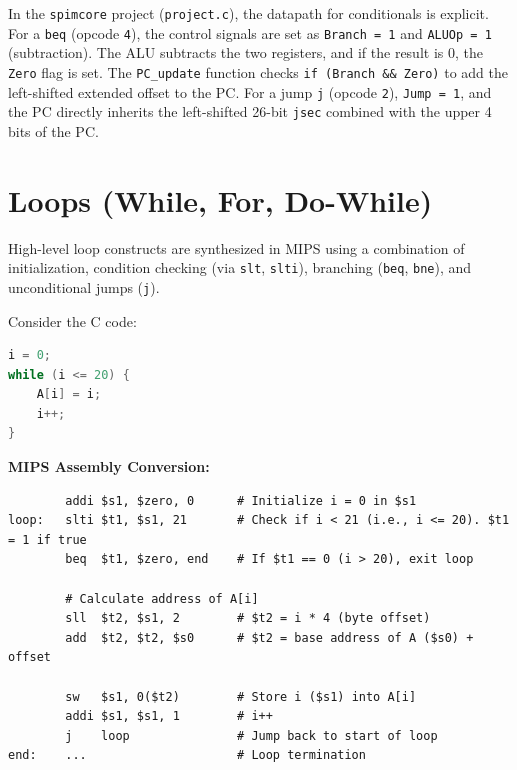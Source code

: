 \begin{remark}
In the \texttt{spimcore} project (\texttt{project.c}), the datapath for conditionals is explicit. For a \texttt{beq} (opcode \texttt{4}), the control signals are set as \texttt{Branch = 1} and \texttt{ALUOp = 1} (subtraction). The ALU subtracts the two registers, and if the result is 0, the \texttt{Zero} flag is set. The \texttt{PC\_update} function checks \texttt{if (Branch \&\& Zero)} to add the left-shifted extended offset to the PC. For a jump \texttt{j} (opcode \texttt{2}), \texttt{Jump = 1}, and the PC directly inherits the left-shifted 26-bit \texttt{jsec} combined with the upper 4 bits of the PC.
\end{remark}

\section{Loops (While, For, Do-While)}

High-level loop constructs are synthesized in MIPS using a combination of initialization, condition checking (via \texttt{slt}, \texttt{slti}), branching (\texttt{beq}, \texttt{bne}), and unconditional jumps (\texttt{j}).

\begin{example}
Consider the C code:

\vspace{10pt}
\begin{lstlisting}[language=C]
i = 0;
while (i <= 20) {
    A[i] = i;
    i++;
}
\end{lstlisting}

\textbf{MIPS Assembly Conversion:}
\begin{lstlisting}
        addi $s1, $zero, 0      # Initialize i = 0 in $s1
loop:   slti $t1, $s1, 21       # Check if i < 21 (i.e., i <= 20). $t1 = 1 if true
        beq  $t1, $zero, end    # If $t1 == 0 (i > 20), exit loop
        
        # Calculate address of A[i]
        sll  $t2, $s1, 2        # $t2 = i * 4 (byte offset)
        add  $t2, $t2, $s0      # $t2 = base address of A ($s0) + offset
        
        sw   $s1, 0($t2)        # Store i ($s1) into A[i]
        addi $s1, $s1, 1        # i++
        j    loop               # Jump back to start of loop
end:    ...                     # Loop termination
\end{lstlisting}
\end{example}

